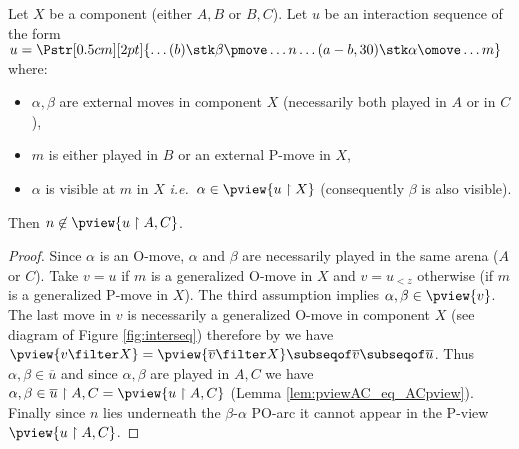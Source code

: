 \begin{lemma}
\label{lem:interjump}
Let $X$ be a component (either  $A,B$ or  $B,C$).
Let $u$ be an interaction sequence of the form
$ u =
\Pstr[0.5cm][2pt]{ \ldots (b){\stk \beta \pmove}  \ldots
 {n}  \ldots  (a-b,30){\stk \alpha\omove}
\ldots m}$ where:
\begin{itemize}[-]
\item $\alpha,\beta$ are external moves in component $X$ (necessarily both played in $A$ or in $C$),
\item  $m$ is either played in $B$ or an external P-move in $X$,
\item  $\alpha$ is visible at $m$ in $X$ \emph{i.e.}~$\alpha\in \pview{u \upharpoonright X}$ (consequently $\beta$ is also visible).
\end{itemize}
Then $n \not\in \pview{u \upharpoonright A, C}$.
\end{lemma}
\begin{proof}
Since $\alpha$ is an O-move, $\alpha$ and $\beta$ are necessarily
played in the same arena ($A$ or $C$). Take $v=u$ if $m$ is a
generalized O-move in $X$ and $v=u_{<z}$ otherwise (if $m$ is a
generalized P-move in $X$). The third assumption implies
$\alpha,\beta\in \pview{v}$. The last move in $v$ is necessarily a
generalized O-move in component $X$ (see diagram of Figure
\ref{fig:interseq}) therefore by \cite[Lemma 3.3.1]{Harmer2005} we
have $\pview{v \filter X} = \pview{\overline{v} \filter X} \subseqof
\overline{v} \subseqof \overline{u}$. Thus $\alpha,\beta \in
\overline{u}$ and since $\alpha,\beta$ are played in $A,C$ we have
$\alpha,\beta  \in \overline{u} \upharpoonright A,C = \pview{u
\upharpoonright A,C}$ (Lemma \ref{lem:pviewAC_eq_ACpview}). Finally
since $n$ lies underneath the $\beta$-$\alpha$ PO-arc it cannot
appear in the P-view  $\pview{u \upharpoonright A,C}$.
\end{proof}

